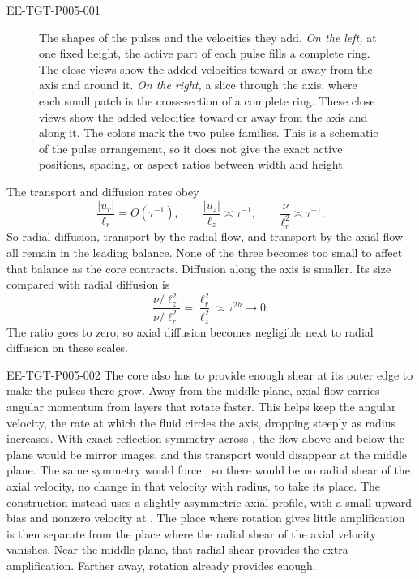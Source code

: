 %
\begin{EESegment}{EE-TGT-P005-001}
\begin{figure}[t]
  \centering
  \caption{The shapes of the pulses and the velocities they add. \emph{On the left,} at one fixed
  height, the active part of each pulse fills a complete ring. The close views show the added
  velocities toward or away from the axis and around it. \emph{On the right,} a slice through the
  axis, where each small patch is the cross-section of a complete ring. These close views show
  the added velocities toward or away from the axis and along it. The colors mark the two pulse
  families. This is a schematic of the pulse arrangement, so it does not give the exact active
  positions, spacing, or aspect ratios between width and height.}\label{fig:2}
\end{figure}%

The transport and diffusion rates obey
\begin{equation*}
  \frac{|u_r|}{\ell_r}=O(\tau^{-1}),
  \qquad \frac{|u_z|}{\ell_z}\asymp\tau^{-1},
  \qquad \frac{\nu}{\ell_r^2}\asymp\tau^{-1}.
\end{equation*}
So radial diffusion, transport by the radial flow, and transport by the axial flow all remain in
the leading balance. None of the three becomes too small to affect that balance as the core
contracts. Diffusion along the axis is smaller. Its size
compared with radial diffusion is
\begin{equation*}
  \frac{\nu/\ell_z^2}{\nu/\ell_r^2}
  =\frac{\ell_r^2}{\ell_z^2}
  \asymp\tau^{2h}\longrightarrow0.
\end{equation*}
The ratio goes to zero, so axial diffusion becomes negligible next to radial diffusion on
these scales.
\end{EESegment}

\begin{EESegment}{EE-TGT-P005-002}
The core also has to provide enough shear at its outer edge to make the pulses there grow. Away
from the middle plane, axial flow carries angular momentum from layers that rotate faster. This
helps keep the angular velocity, the rate at which the fluid circles the axis, dropping steeply
as radius increases. With exact reflection symmetry across
, the flow above and below the plane would be mirror images, and this
transport would disappear at the middle plane. The same symmetry would force
, so there would be no radial shear of the axial velocity, no
change in that velocity with radius, to take its place. The construction instead uses a slightly
asymmetric axial profile, with a small upward bias and nonzero velocity at
. The place where rotation gives little amplification is then separate
from the place where the radial shear of the axial velocity vanishes. Near the middle plane,
that radial shear provides the extra amplification. Farther away, rotation already provides
enough.
\end{EESegment}

